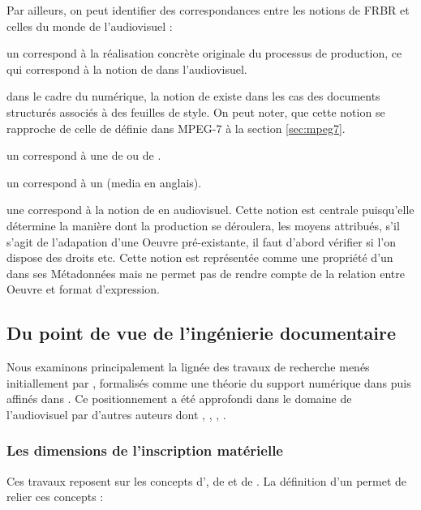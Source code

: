 Par ailleurs, on peut identifier des correspondances entre les notions de FRBR et celles du monde de l'audiovisuel :
\begin{liste}
	\item un  correspond à la réalisation concrète originale du processus de production, ce qui correspond à la notion de  dans l'audiovisuel.
	
	\item dans le cadre du numérique, la notion de  existe dans les cas des documents structurés associés à des feuilles de style.
	On peut noter, que cette notion se rapproche de celle de  définie dans MPEG-7 à la section \ref{sec:mpeg7}.

	\item un  correspond à une  de  ou de .
	\item un  correspond à un  (media en anglais).

	\item une  correspond à la notion de  en audiovisuel.
	Cette notion est centrale puisqu'elle détermine la manière dont la production se déroulera, les moyens attribués, s'il s'agit de l'adapation d'une Oeuvre pré-existante, il faut d'abord vérifier si l'on dispose des droits etc.
	Cette notion est représentée comme une propriété d'un  dans ses Métadonnées mais ne permet pas de rendre compte de la relation entre Oeuvre et format d'expression.
\end{liste}





\subsection{Du point de vue de l'ingénierie documentaire}\label{sec:pv-id}
Nous examinons principalement la lignée des travaux de recherche menés initiallement par \cite{Bachimont1998}, formalisés comme une théorie du support numérique dans \cite{bachimont:hdr} puis affinés dans \cite{bachimont:icc}. 
Ce positionnement a été approfondi dans le domaine de l'audiovisuel par d'autres auteurs dont \cite{Prie1999}, \cite{Troncy2004}, \cite{Morizet-mahoudeaux2005a}, \cite{Gaillard2008}.

\subsubsection{Les dimensions de l'inscription matérielle}
Ces travaux reposent sur les concepts d', de  et de . 
La définition d'un  permet de relier ces concepts : 
 

